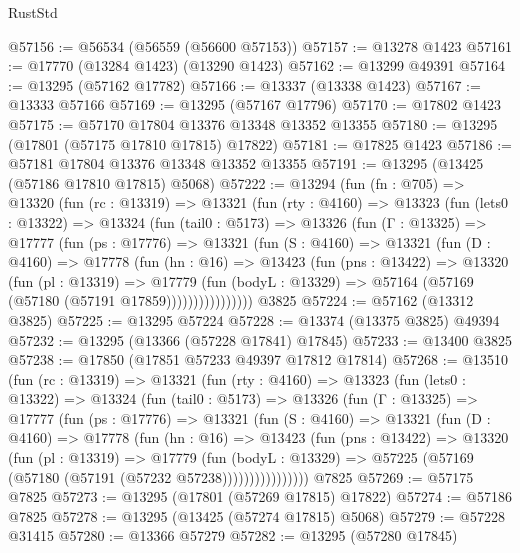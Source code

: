\begin{lexlean}{RustStd}
\begin{coremodule}
@57156 := @56534 (@56559 (@56600 @57153))
@57157 := @13278 @1423
@57161 := @17770 (@13284 @1423) (@13290 @1423)
@57162 := @13299 @49391
@57164 := @13295 (@57162 @17782)
@57166 := @13337 (@13338 @1423)
@57167 := @13333 @57166
@57169 := @13295 (@57167 @17796)
@57170 := @17802 @1423
@57175 := @57170 @17804 @13376 @13348 @13352 @13355
@57180 := @13295 (@17801 (@57175 @17810 @17815) @17822)
@57181 := @17825 @1423
@57186 := @57181 @17804 @13376 @13348 @13352 @13355
@57191 := @13295 (@13425 (@57186 @17810 @17815) @5068)
@57222 := @13294
    (fun (fn : @705) =>
    @13320
      (fun (rc : @13319) =>
      @13321
        (fun (rty : @4160) =>
        @13323
          (fun (lets0 : @13322) =>
          @13324
            (fun (tail0 : @5173) =>
            @13326
              (fun (Γ : @13325) =>
              @17777
                (fun (ps : @17776) =>
                @13321
                  (fun (S : @4160) =>
                  @13321
                    (fun (D : @4160) =>
                    @17778
                      (fun (hn : @16) =>
                      @13423
                        (fun (pns : @13422) =>
                        @13320
                          (fun (pl : @13319) =>
                          @17779
                            (fun (bodyL : @13329) =>
                            @57164 (@57169 (@57180 (@57191 @17859))))))))))))))))
    @3825
@57224 := @57162 (@13312 @3825)
@57225 := @13295 @57224
@57228 := @13374 (@13375 @3825) @49394
@57232 := @13295 (@13366 (@57228 @17841) @17845)
@57233 := @13400 @3825
@57238 := @17850 (@17851 @57233 @49397 @17812 @17814)
@57268 := @13510
    (fun (rc : @13319) =>
    @13321
      (fun (rty : @4160) =>
      @13323
        (fun (lets0 : @13322) =>
        @13324
          (fun (tail0 : @5173) =>
          @13326
            (fun (Γ : @13325) =>
            @17777
              (fun (ps : @17776) =>
              @13321
                (fun (S : @4160) =>
                @13321
                  (fun (D : @4160) =>
                  @17778
                    (fun (hn : @16) =>
                    @13423
                      (fun (pns : @13422) =>
                      @13320
                        (fun (pl : @13319) =>
                        @17779
                          (fun (bodyL : @13329) =>
                          @57225 (@57169 (@57180 (@57191 (@57232 @57238))))))))))))))))
    @7825
@57269 := @57175 @7825
@57273 := @13295 (@17801 (@57269 @17815) @17822)
@57274 := @57186 @7825
@57278 := @13295 (@13425 (@57274 @17815) @5068)
@57279 := @57228 @31415
@57280 := @13366 @57279
@57282 := @13295 (@57280 @17845)

\end{coremodule}
\end{lexlean}
